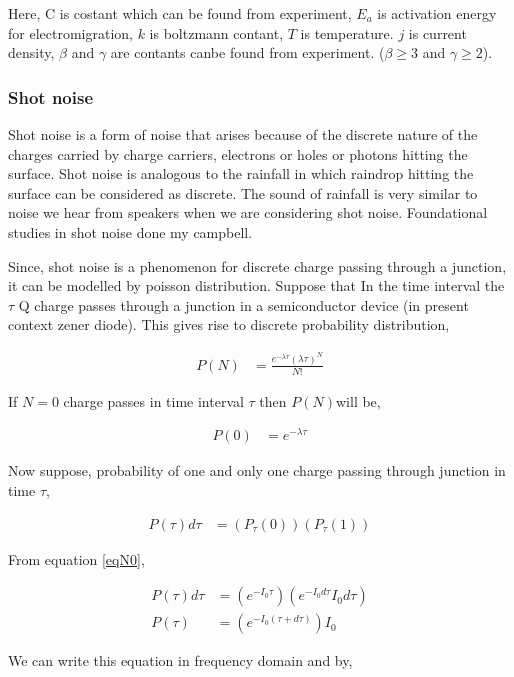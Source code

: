 Here, C is costant which can be found from experiment, $E_a$ is activation energy for electromigration, $k$ is boltzmann contant, $T$ is temperature. $j$ is current density, $\beta$ and $\gamma$ are contants canbe found from experiment. ($\beta \geq 3$ and $\gamma \geq 2$).
\subsubsection{Shot noise \label{thshot}}

Shot noise is a form of noise that arises because of the discrete nature of the charges carried by charge carriers, electrons or holes or photons hitting the surface. Shot noise is analogous to the rainfall in which raindrop hitting the surface can be considered as discrete. The sound of rainfall is very similar to noise we hear from speakers when we are considering shot noise. Foundational studies in shot noise done my campbell.\cite{campbell1909study}

Since, shot noise is a phenomenon for discrete charge passing through a junction, it can be modelled by poisson distribution. Suppose that In the time interval the $\tau$ Q charge passes through a junction in a semiconductor device (in present context zener diode). This gives rise to discrete probability distribution,

\begin{align}
P(N) & = \frac{e^{-\lambda \tau}(\lambda \tau)^{N}}{N!}
\end{align}

If $N=0$ charge passes in time interval $\tau$ then $P(N)$will be,

\begin{align} \label{eqN0}
P(0) & = e^{-\lambda \tau}
\end{align}

Now suppose, probability of one and only one charge passing through junction in time $\tau$,

\begin{align*}
P(\tau)d\tau & = (P_{\tau}(0))(P_{\tau}(1))
\end{align*}

From equation \ref{eqN0},


\begin{align*}
P(\tau)d\tau & = (e^{-I_0 \tau})(e^{-I_0 d\tau} I_0 d\tau)\\
P(\tau) & = (e^{-I_0 (\tau + d\tau)}) I_0
\end{align*}

We can write this equation in frequency domain and by,

